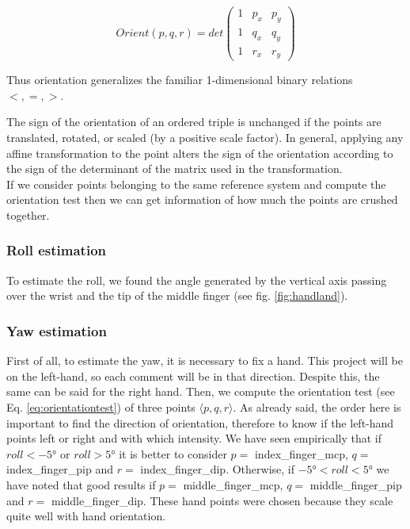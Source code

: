 \begin{Equation}[!htb]
	\centering
	\begin{equation} \label{eq:orientationtest}
		Orient(p,q,r) = det
		\begin{pmatrix}
		1 & p_x & p_y \\
		1 & q_x & q_y \\
		1 & r_x & r_y 
		\end{pmatrix}
		\end{equation}
	\caption[Orientation test.]{Thus orientation generalizes the familiar 1-dimensional binary relations $<, =, >$.}
\end{Equation}

\noindent The sign of the orientation of an ordered triple is unchanged if the points are translated, rotated, or scaled (by a positive scale factor). In general, applying any affine transformation to the point alters the sign of the orientation according to the sign of the determinant of the matrix used in the transformation. \\

\noindent If we consider points belonging to the same reference system and compute the orientation test then we can get information of how much the points are crushed together. 

\subsubsection{Roll estimation}
\label{subsec:roll}
To estimate the roll, we found the angle generated by the vertical axis passing over the wrist and the tip of the middle finger (see fig. \ref{fig:handland}).

\subsubsection{Yaw estimation}
\label{subsec:yaw}
First of all, to estimate the yaw, it is necessary to fix a hand. This project will be on the left-hand, so each comment will be in that direction. Despite this, the same can be said for the right hand. Then, we compute the orientation test (see Eq. \ref{eq:orientationtest}) of three points $\langle p, q, r \rangle$. As already said, the order here is important to find the direction of orientation, therefore to know if the left-hand points left or right and with which intensity. We have seen empirically that if $roll < \ang{-5}$ or $roll > \ang{+5}$ it is better to consider $p=$ index\_finger\_mcp, $q=$ index\_finger\_pip and $r=$ index\_finger\_dip. Otherwise, if $\ang{-5} < roll < \ang{+5}$ we have noted that good results if $p=$ middle\_finger\_mcp, $q=$ middle\_finger\_pip and $r=$ middle\_finger\_dip. These hand points were chosen because they scale quite well with hand orientation. \\

